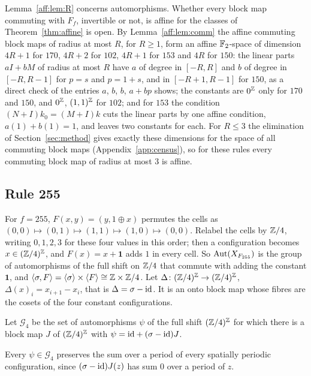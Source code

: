 \begin{remark}\label{aff:rem:endo}
Lemma~\ref{aff:lem:R} concerns automorphisms. Whether every block map commuting with $F_f$, invertible or not, is affine for the classes of Theorem~\ref{thm:affine} is open. By Lemma~\ref{aff:lem:comm} the affine commuting block maps of radius at most $R$, for $R\ge1$, form an affine $\mathbb{F}_2$-space of dimension $4R+1$ for $170$, $4R+2$ for $102$, $4R+1$ for $153$ and $4R$ for $150$: the linear parts $aI+bM$ of radius at most $R$ have $a$ of degree in $[-R,R]$ and $b$ of degree in $[-R,R-1]$ for $p=s$ and $p=1+s$, and in $[-R+1,R-1]$ for $150$, as a direct check of the entries $a$, $b$, $b$, $a+bp$ shows; the constants are $0^{\mathbb{Z}}$ only for $170$ and $150$, and $0^{\mathbb{Z}}$, $(1,1)^{\mathbb{Z}}$ for $102$; and for $153$ the condition $(N+I)k_0=(M+I)k$ cuts the linear parts by one affine condition, $a(1)+b(1)=1$, and leaves two constants for each. For $R\le3$ the elimination of Section~\ref{sec:method} gives exactly these dimensions for the space of all commuting block maps (Appendix~\ref{app:census}), so for these rules every commuting block map of radius at most $3$ is affine.
\end{remark}

\subsection{Rule 255}\label{aff:sec:255}

For $f=255$, $F(x,y)=(y,1\oplus x)$ permutes the cells as $(0,0)\mapsto(0,1)\mapsto(1,1)\mapsto(1,0)\mapsto(0,0)$. Relabel the cells by $\mathbb{Z}/4$, writing $0,1,2,3$ for these four values in this order; then a configuration becomes $x\in(\mathbb{Z}/4)^{\mathbb{Z}}$, and $F(x)=x+\mathbf 1$ adds $1$ in every cell. So $\operatorname{Aut}(X_{F_{255}})$ is the group of automorphisms of the full shift on $\mathbb{Z}/4$ that commute with adding the constant $\mathbf 1$, and $\langle\sigma,F\rangle=\langle\sigma\rangle\times\langle F\rangle\cong\mathbb{Z}\times\mathbb{Z}/4$. Let $\Delta\colon(\mathbb{Z}/4)^{\mathbb{Z}}\to(\mathbb{Z}/4)^{\mathbb{Z}}$, $\Delta(x)_i=x_{i+1}-x_i$, that is $\Delta=\sigma-\mathrm{id}$. It is an onto block map whose fibres are the cosets of the four constant configurations.

\begin{definition}\label{aff:def:G4}
Let $\mathcal G_4$ be the set of automorphisms $\psi$ of the full shift $(\mathbb{Z}/4)^{\mathbb{Z}}$ for which there is a block map $J$ of $(\mathbb{Z}/4)^{\mathbb{Z}}$ with $\psi=\mathrm{id}+(\sigma-\mathrm{id})J$.
\end{definition}

Every $\psi\in\mathcal G_4$ preserves the sum over a period of every spatially periodic configuration, since $(\sigma-\mathrm{id})J(z)$ has sum $0$ over a period of $z$.

